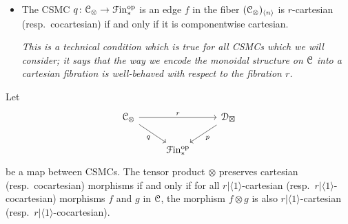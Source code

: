 \documentclass[main.tex]{subfiles}
\begin{document}
\begin{definition}
\begin{itemize}
    \item The CSMC $q\colon \mathcal{C}_{\otimes} \to \mathcal{F}\mathrm{in}_{*}^{\mathrm{op}}$ is  an edge $f$ in the fiber $(\mathcal{C}_{\otimes})_{\langle n \rangle}$ is $r$-cartesian (resp.\ cocartesian) if and only if it is componentwise cartesian.

      \textit{This is a technical condition which is true for all CSMCs which we will consider; it says that the way we encode the monoidal structure on $\mathcal{C}$ into a cartesian fibration is well-behaved with respect to the fibration $r$.}
  \end{itemize}
\end{definition}

\begin{lemma}
  \label{lemma:co_cartesian_preservation_determined_by_bifunctor}
  Let
  \begin{equation*}
    \begin{tikzcd}
      \category{C}_{\otimes}
      \arrow[rr, "r"]
      \arrow[dr, swap, "q"]
      && \category{D}_{\boxtimes}
      \arrow[dl, "p"]
      \\
      & \Finp\op
    \end{tikzcd}
  \end{equation*}
  be a map between CSMCs. The tensor product $\otimes$ preserves cartesian (resp.\ cocartesian) morphisms if and only if for all $r|\langle 1 \rangle$-cartesian (resp.\ $r|\langle 1 \rangle$-cocartesian) morphisms $f$ and $g$ in $\mathcal{C}$, the morphism $f \otimes g$ is also $r|\langle 1 \rangle$-cartesian (resp.\ $r|\langle 1 \rangle$-cocartesian).
\end{lemma}
\end{document}
